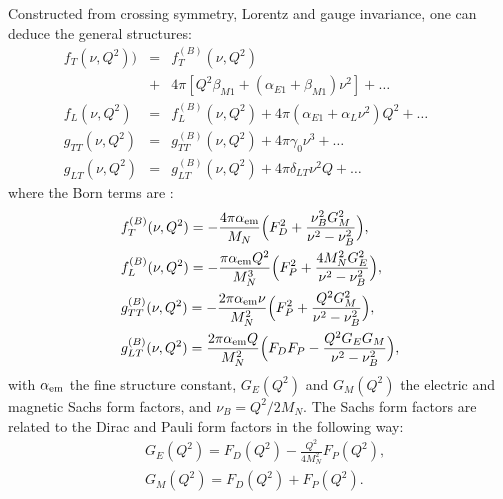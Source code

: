 \documentclass[twocolumn,prc,showpacs,nofootinbib,preprintnumbers,amsmath,amssymb,superscriptaddress]{revtex4-1}
\def\eqlab#1{\label{eq:#1}}
\def\nn{\nonumber}
\begin{document}
\vfill\null
Constructed from crossing symmetry, Lorentz and gauge invariance, one can deduce the general structures: 
\begin{subequations}
\eqlab{fgFunctions}
\begin{eqnarray}
  f_T(\nu, Q^2))&=& f_T^{(B)}(\nu, Q^2)\nn\\
 &+&4\pi\left[ Q^2 \beta_{M1} +(\alpha_{E1} + \beta_{M1}) \nu^2\right] + \dots \label{Eq:LEX-fT}\\
  f_L(\nu, Q^2)&=& f_L^{(B)}(\nu, Q^2) + 4 \pi(\alpha_{E1}+\alpha_{L} \nu^2) Q^2 + \dots \qquad \label{Eq:LEX-fL}\\
  g_{TT}(\nu, Q^2)&=&g^{(B)}_{TT}(\nu, Q^2) + 4 \pi\gamma_0  \nu^3 + \dots \label{Eq:LEX-gTT}\\
  g_{LT}(\nu, Q^2)&=&g^{(B)}_{LT}(\nu, Q^2) +  4 \pi\delta_{LT} \nu^2 Q + \dots \label{Eq:LEX-gLT}
\end{eqnarray}
\end{subequations}
\newpage
where the Born terms are \cite{Drechsel:2002ar}:
\begin{subequations}
\begin{align}
 & f_T^{(B)}(\nu, Q^2) =  - \frac{4\pi \alpha_{\rm em}}{M_N} \Big( F_D^2 + \frac{\nu_B^2 G_M^2}{\nu^2-\nu_B^2} \Big), \label{Eq:BT-fT}\\
  &  f_L^{(B)}(\nu, Q^2) = - \frac{\pi \alpha_{\rm em} Q^2}{ M_N^3} \Big( F_P^2 + \frac{4M_N^2 G_E^2}{\nu^2-\nu_B^2} \Big), \label{Eq:BT-fL}\\
 & g^{(B)}_{TT}(\nu, Q^2) = - \frac{2\pi \alpha_{\rm em} \nu}{ M_N^2} \Big( F_P^2 + \frac{Q^2 G_M^2}{\nu^2-\nu_B^2} \Big), \label{Eq:BT-gTT}\\
 & g^{(B)}_{LT}(\nu, Q^2) =  \frac{2 \pi\alpha_{\rm em} Q}{M_N^2} \Big( F_D F_P - \frac{Q^2 G_E G_M }{\nu^2-\nu_B^2} \Big), \label{Eq:BT-gTL}
\end{align}
\end{subequations}
with $\alpha_{\rm em}$ the fine structure constant, $G_E(Q^2)$ and $G_M(Q^2)$ the electric and magnetic Sachs form factors, and $\nu_B=Q^2/2M_N$. 
The Sachs form factors are related to the Dirac and Pauli form factors in the following way:
\begin{subequations}
\begin{align}
& G_E(Q^2)=F_D(Q^2) - \frac{Q^2}{4M_N^2} F_P(Q^2),\\
& G_M(Q^2)=F_D(Q^2) + F_P(Q^2).
\end{align}
\end{subequations}
\end{document}
